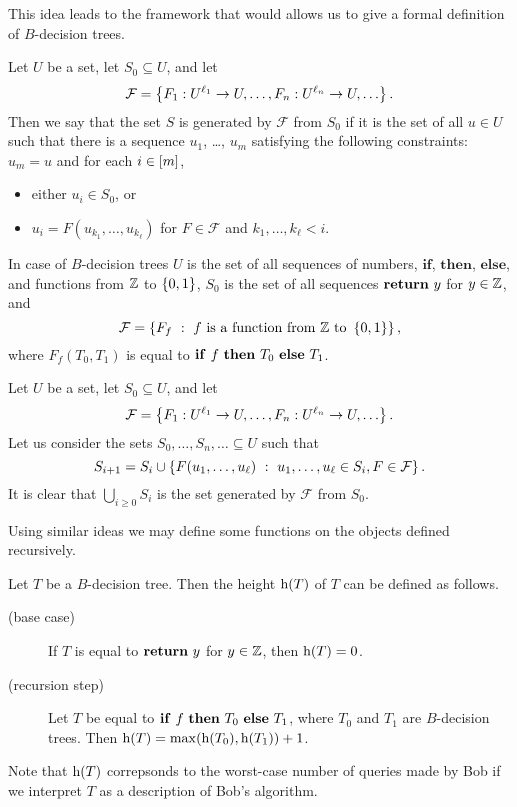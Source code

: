 This idea leads to the framework that would allows us to give a formal
definition of $B$-decision trees.
\begin{definition}
  Let $U$ be a set, let $S_0 \subseteq U$, and let
  \[
    \mathcal{F} =
    \set{F_1 : U^{\ell_1} \to U, \dots, F_n : U^{\ell_n} \to U, \dots}.
  \]
  Then we say that the set $S$ is generated by $\mathcal{F}$ from $S_0$ if 
  it is the set of all $u \in U$ such that there is a sequence
  $u_1$, \dots, $u_m$ satisfying the following constraints: $u_m = u$ and
  for each $i \in {[{m}]}$,
  \begin{itemize}
    \item either $u_i \in S_0$, or
    \item $u_i = F(u_{k_1}, \dots, u_{k_\ell})$
      for $F \in \mathcal{F}$ and $k_1, \dots, k_\ell < i$.
  \end{itemize}
\end{definition}
In case of $B$-decision trees $U$ is the set of all sequences of numbers,
$\mathbf{if}$, $\mathbf{then}$, $\mathbf{else}$, and functions from ${\mathbb{Z}}$ to $\set{0, 1}$,
$S_0$ is the set of all sequences $\mathbf{return}~{y}$ for $y \in {\mathbb{Z}}$, and
\[
  \mathcal{F} =
  \set[
    {
      f \text{ is a function from } \Z
        \text{ to } \set{0, 1}
    }
  ]{F_f},
\]
where $F_f(T_0, T_1)$ is equal to $\mathbf{if}~{f}~\mathbf{then}~{T_0}~\mathbf{else}~{T_1}$.

\begin{remark}
  Let $U$ be a set, let $S_0 \subseteq U$, and let
  \[
    \mathcal{F} =
    \set{F_1 : U^{\ell_1} \to U, \dots, F_n : U^{\ell_n} \to U, \dots}.
  \]
  Let us consider the sets $S_0, \dots, S_n, \dots \subseteq U$ such that 
  \[
    S_{i + 1} = S_i \cup 
    \set[u_1, \dots, u_\ell \in S_i, F \in \mathcal{F}]{F(u_1, \dots, u_\ell)}.
  \]
  It is clear that $\bigcup_{i \ge 0} S_i$ is the set generated by $\mathcal{F}$
  from $S_0$.
\end{remark}

Using similar ideas we may define some functions on the objects defined
recursively.
\begin{definition}
  Let $T$ be a $B$-decision tree. Then the height $\DTHeight{T}$ of $T$ can be
  defined as follows.
  \begin{description}
    \item [(base case)] If $T$ is equal to $\mathbf{return}~{y}$ for $y \in {\mathbb{Z}}$, 
      then $\DTHeight{T} = 0$.
    \item[(recursion step)] Let $T$ be equal to $\mathbf{if}~{f}~\mathbf{then}~{T_0}~\mathbf{else}~{T_1}$, where
      $T_0$ and $T_1$ are $B$-decision trees. 
      Then $\DTHeight{T} = \max(\DTHeight{T_0}, \DTHeight{T_1}) + 1$.
  \end{description}
\end{definition}
Note that $\DTHeight{T}$ correpsonds to the worst-case number of queries made by
Bob if we interpret $T$ as a description of Bob's algorithm.

